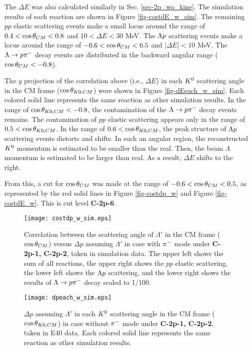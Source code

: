 The $\Delta E$ was also calculated similarly in Sec. \ref{sec-2p_wo_kine}. The simulation results of each reaction are shown in Figure \ref{fig-costdE_w_sim}. The remaining $pp$ elastic scattering events make a small locus around the range of $0.4<\cos{\theta}_{CM}<0.8$ and $10<\Delta E<30$ MeV. The $\Lambda p$ scattering events make a locus around the range of $-0.6<\cos{\theta}_{CM}<0.5$ and $|\Delta E|<10$ MeV. The $\Lambda\to p\pi^{-}$ decay events are distributed in the backward angular range ($\cos{\theta}_{CM}<-0.8$).

The $y$ projection of the correlation above (i.e., $\Delta E$) in each $K^{0}$ scattering angle in the CM frame ($\cos{\theta_{K0,CM}}$) were shown in Figure \ref{fig-dEeach_w_sim}. Each colored solid line represents the same reaction as other simulation results.
In the range of $\cos{\theta_{K0,CM}}<-0.8$, the contamination of the $\Lambda\to p\pi^{-}$ decay events remains. The contamination of $pp$ elastic scattering appears only in the range of $0.5<\cos{\theta_{K0,CM}}$. In the range of $0.6<\cos{\theta_{K0,CM}}$, the peak structure of $\Lambda p$ scattering events distorts and shifts. In such an angular region, the reconstructed $K^{0}$ momentum is estimated to be smaller than the real. Then, the beam $\Lambda$ momentum is estimated to be larger than real. As a result, $\Delta E$ shifts to the right. 

From this, a cut for $\cos{\theta}_{CM}$ was made at the range of $-0.6<\cos{\theta}_{CM}<0.5$, as represented by the red solid lines in Figure \ref{fig-costdp_w} and Figure \ref{fig-costdE_w}. This is cut level {\bf C-2p-6}.


\begin{figure}[!h]
  \begin{center}
    \texttt{[image: costdp\_w\_sim.eps]}
    \caption{Correlation between the scattering angle of $\Lambda'$ in the CM frame ($\cos{\theta}_{CM}$) versus $\Delta p$ assuming $\Lambda'$ in case  with $\pi^{-}$ mode under {\bf C-2p-1, C-2p-2}, taken in simulation data. The upper left shows the sum of all reactions, the upper right shows the $pp$ elastic scattering, the lower left shows the $\Lambda p$ scattering, and the lower right shows the results of $\Lambda\to p\pi^{-}$ decay scaled to 1/100.}
    \label{fig-costdp_w_sim}
  \end{center}
\end{figure}

\begin{figure}[!h]
  \begin{center}
    \texttt{[image: dpeach\_w\_sim.eps]}
    \caption{$\Delta p$ assuming $\Lambda'$ in each $K^{0}$ scattering angle in the CM frame ($\cos{\theta_{K0,CM}}$) in case  without $\pi^{-}$ mode under {\bf C-2p-1, C-2p-2}, taken in E40 data. Each colored solid line represents the same reaction as other simulation results.}
    \label{fig-dpeach_w_sim}
  \end{center}
\end{figure}

